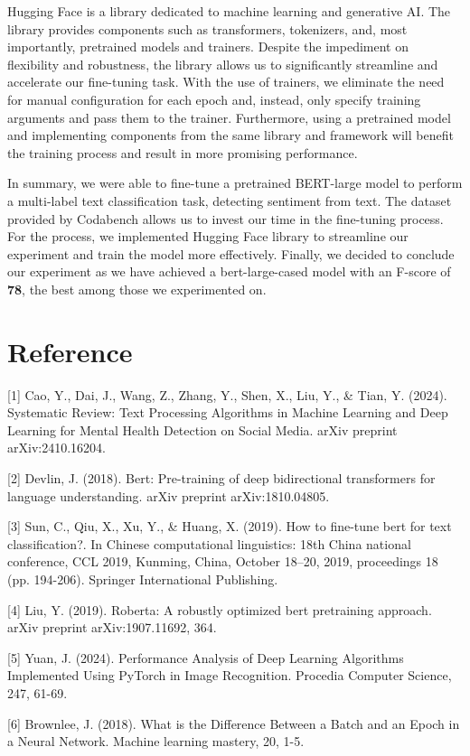 \documentclass[11pt]{article}
\begin{document}
Hugging Face is a library dedicated to machine learning and generative AI. The library provides components such as transformers, tokenizers, and, most importantly, pretrained models and trainers. Despite the impediment on flexibility and robustness, the library allows us to significantly streamline and accelerate our fine-tuning task. With the use of trainers, we eliminate the need for manual configuration for each epoch and, instead, only specify training arguments and pass them to the trainer. Furthermore, using a pretrained model and implementing components from the same library and framework will benefit the training process and result in more promising performance. 

In summary, we were able to fine-tune a pretrained BERT-large model to perform a multi-label text classification task, detecting sentiment from text. The dataset provided by Codabench allows us to invest our time in the fine-tuning process. For the process, we implemented Hugging Face library to streamline our experiment and train the model more effectively. Finally, we decided to conclude our experiment as we have achieved a bert-large-cased model with an F-score of \textbf{78}, the best among those we experimented on.
\section{Reference}
[1] Cao, Y., Dai, J., Wang, Z., Zhang, Y., Shen, X., Liu, Y., \& Tian, Y. (2024). Systematic Review: Text Processing Algorithms in Machine Learning and Deep Learning for Mental Health Detection on Social Media. arXiv preprint arXiv:2410.16204.

[2] Devlin, J. (2018). Bert: Pre-training of deep bidirectional transformers for language understanding. arXiv preprint arXiv:1810.04805.

[3] Sun, C., Qiu, X., Xu, Y., \& Huang, X. (2019). How to fine-tune bert for text classification?. In Chinese computational linguistics: 18th China national conference, CCL 2019, Kunming, China, October 18–20, 2019, proceedings 18 (pp. 194-206). Springer International Publishing.

[4] Liu, Y. (2019). Roberta: A robustly optimized bert pretraining approach. arXiv preprint arXiv:1907.11692, 364.

[5] Yuan, J. (2024). Performance Analysis of Deep Learning Algorithms Implemented Using PyTorch in Image Recognition. Procedia Computer Science, 247, 61-69.

[6] Brownlee, J. (2018). What is the Difference Between a Batch and an Epoch in a Neural Network. Machine learning mastery, 20, 1-5.
\end{document}
